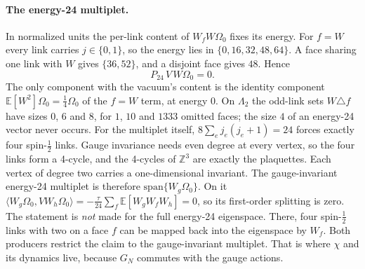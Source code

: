\paragraph{The energy-24 multiplet.}
In normalized units the per-link content of $W_fW\Omega_0$ fixes its energy.
For $f=W$ every link carries $j\in\{0,1\}$, so the energy lies in
$\{0,16,32,48,64\}$. A face sharing one link with $W$ gives $\{36,52\}$, and a
disjoint face gives $48$. Hence
\begin{equation}
 P_{24}\,V\,W\Omega_0=0 .
 \label{eq:aw1-p24}
\end{equation}
The only component with the vacuum's content is the identity component
$\mathbb E[W^2]\Omega_0=\tfrac14\Omega_0$ of the $f=W$ term, at energy $0$. On
$\Lambda_2$ the odd-link sets $W\triangle f$ have sizes $0$, $6$ and $8$, for
$1$, $10$ and $1333$ omitted faces; the size $4$ of an energy-24 vector never
occurs. For the multiplet itself, $8\sum_ej_e(j_e+1)=24$ forces exactly four
spin-$\tfrac12$ links. Gauge invariance needs even degree at every vertex, so
the four links form a 4-cycle, and the 4-cycles of $\mathbb Z^3$ are exactly
the plaquettes. Each vertex of degree two carries a one-dimensional
invariant. The gauge-invariant energy-24 multiplet is therefore
$\mathrm{span}\{W_g\Omega_0\}$. On it
$\langle W_g\Omega_0,VW_h\Omega_0\rangle=-\tfrac{\tau}{24}\sum_f\mathbb E[W_gW_fW_h]=0$,
so its first-order splitting is zero. The statement is \emph{not} made for the
full energy-24 eigenspace. There, four spin-$\tfrac12$ links with two on a
face $f$ can be mapped back into the eigenspace by $W_f$. Both producers
restrict the claim to the gauge-invariant multiplet. That is where $\chi$ and
its dynamics live, because $G_N$ commutes with the gauge actions.

